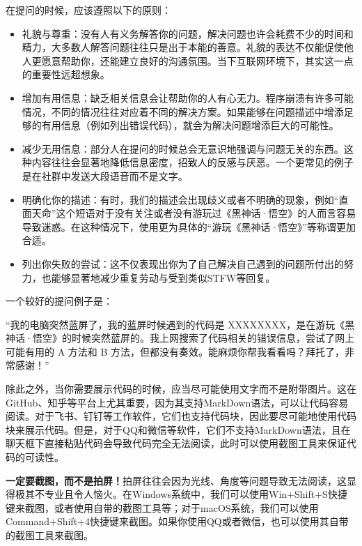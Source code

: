 \documentclass[../main.tex]{subfiles}
\begin{document}
在提问的时候，应该遵照以下的原则：

\begin{itemize}
  \item 礼貌与尊重：没有人有义务解答你的问题，解决问题也许会耗费不少的时间和精力，大多数人解答问题往往只是出于本能的善意。礼貌的表达不仅能促使他人更愿意帮助你，还能建立良好的沟通氛围。当下互联网环境下，其实这一点的重要性远超想象。
  \item 增加有用信息：缺乏相关信息会让帮助你的人有心无力。程序崩溃有许多可能情况，不同的情况往往对应着不同的解决方案。如果能够在问题描述中增添足够的有用信息（例如列出错误代码），就会为解决问题增添巨大的可能性。
  \item 减少无用信息：部分人在提问的时候总会无意识地强调与问题无关的东西。这种内容往往会显著地降低信息密度，招致人的反感与厌恶。一个更常见的例子是在社群中发送大段语音而不是文字。
  \item 明确化你的描述：有时，我们的描述会出现歧义或者不明确的现象，例如“直面天命”这个短语对于没有关注或者没有游玩过《黑神话·悟空》的人而言容易导致迷惑。在这种情况下，使用更为具体的“游玩《黑神话·悟空》”等称谓更加合适。
  \item 列出你失败的尝试：这不仅表现出你为了自己解决自己遇到的问题所付出的努力，也能够显著地减少重复劳动与受到类似STFW等回复。
\end{itemize}

一个较好的提问例子是：

“我的电脑突然蓝屏了，我的蓝屏时候遇到的代码是 XXXXXXXX，是在游玩《黑神话·悟空》的时候突然蓝屏的。我上网搜索了代码相关的错误信息，尝试了网上可能有用的 A 方法和 B 方法，但都没有奏效。能麻烦你帮我看看吗？拜托了，非常感谢！”

除此之外，当你需要展示代码的时候，应当尽可能使用文字而不是附带图片。这在GitHub、知乎等平台上尤其重要，因为其支持MarkDown语法，可以让代码容易阅读。对于飞书、钉钉等工作软件，它们也支持代码块，因此要尽可能地使用代码块来展示代码。但是，对于QQ和微信等软件，它们不支持MarkDown语法，且在聊天框下直接粘贴代码会导致代码完全无法阅读，此时可以使用截图工具来保证代码的可读性。

\textbf{一定要截图，而不是拍屏！}拍屏往往会因为光线、角度等问题导致无法阅读，这显得极其不专业且令人恼火。在Windows系统中，我们可以使用Win+Shift+S快捷键来截图，或者使用自带的截图工具等；对于macOS系统，我们可以使用Command+Shift+4快捷键来截图。如果你使用QQ或者微信，也可以使用其自带的截图工具来截图。
\end{document}
